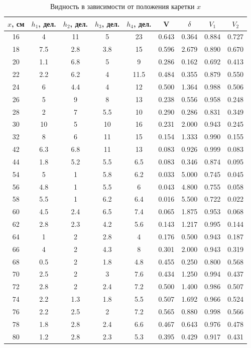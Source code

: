 \documentclass[a4paper,12pt]{article}
\begin{document}
\begin{table}[H]
	\centering
	\begin{tabular}{|c|c|c|c|c|c|c|c|c|}
		\hline
		$x$, см  & $h_1$, дел. & $h_2$, дел. & $h_3$, дел. & $h_4$, дел. & V     & $\delta$ & $V_1$  & $V_2$  \\ \hline
		16 & 4    & 11   & 5    & 23   & 0.643 & 0.364 & 0.884 & 0.727 \\ \hline
		18 & 7.5  & 2.8  & 3.8  & 15   & 0.596 & 2.679 & 0.890 & 0.670 \\ \hline
		20 & 1.1  & 6.8  & 5    & 9    & 0.286 & 0.162 & 0.692 & 0.413 \\ \hline
		22 & 2.2  & 6.2  & 4    & 11.5 & 0.484 & 0.355 & 0.879 & 0.550 \\ \hline
		24 & 6    & 4.4  & 4    & 12   & 0.500 & 1.364 & 0.988 & 0.506 \\ \hline
		26 & 5    & 9    & 8    & 13   & 0.238 & 0.556 & 0.958 & 0.248 \\ \hline
		28 & 2    & 7    & 5.5  & 10   & 0.290 & 0.286 & 0.831 & 0.349 \\ \hline
		30 & 10   & 5    & 10   & 16   & 0.231 & 2.000 & 0.943 & 0.245 \\ \hline
		32 & 8    & 6    & 11   & 15   & 0.154 & 1.333 & 0.990 & 0.155 \\ \hline
		42 & 6.3  & 6.8  & 11   & 13   & 0.083 & 0.926 & 0.999 & 0.083 \\ \hline
		44 & 1.8  & 5.2  & 5.5  & 6.5  & 0.083 & 0.346 & 0.874 & 0.095 \\ \hline
		54 & 5    & 1    & 5.8  & 6.2  & 0.033 & 5.000 & 0.745 & 0.045 \\ \hline
		56 & 4.8  & 1    & 5.5  & 6    & 0.043 & 4.800 & 0.755 & 0.058 \\ \hline
		58 & 5.5  & 1    & 6.2  & 6.4  & 0.016 & 5.500 & 0.722 & 0.022 \\ \hline
		60 & 4.5  & 2.4  & 6.5  & 7.4  & 0.065 & 1.875 & 0.953 & 0.068 \\ \hline
		62 & 2.8  & 2.3  & 4.2  & 5.6  & 0.143 & 1.217 & 0.995 & 0.144 \\ \hline
		64 & 1    & 2    & 2.8  & 4    & 0.176 & 0.500 & 0.943 & 0.187 \\ \hline
		66 & 4    & 2    & 4.3  & 8    & 0.301 & 2.000 & 0.943 & 0.319 \\ \hline
		68 & 0.5  & 2    & 1.8  & 4.8  & 0.455 & 0.250 & 0.800 & 0.568 \\ \hline
		70 & 2.5  & 2    & 3    & 7.6  & 0.434 & 1.250 & 0.994 & 0.437 \\ \hline
		72 & 2.8  & 2    & 2.4  & 7.2  & 0.500 & 1.400 & 0.986 & 0.507 \\ \hline
		74 & 2.2  & 1.3  & 1.8  & 5.5  & 0.507 & 1.692 & 0.966 & 0.524 \\ \hline
		76 & 2.2  & 2.5  & 2    & 7.2  & 0.565 & 0.880 & 0.998 & 0.566 \\ \hline
		78 & 1.8  & 2.8  & 2.4  & 6.6  & 0.467 & 0.643 & 0.976 & 0.478 \\ \hline
		80 & 1.2  & 2.8  & 2.3  & 5.3  & 0.395 & 0.429 & 0.917 & 0.431 \\ \hline
	\end{tabular}
	\caption{ Видность в зависимости от положения каретки  $x$}
\end{table}
\end{document}
